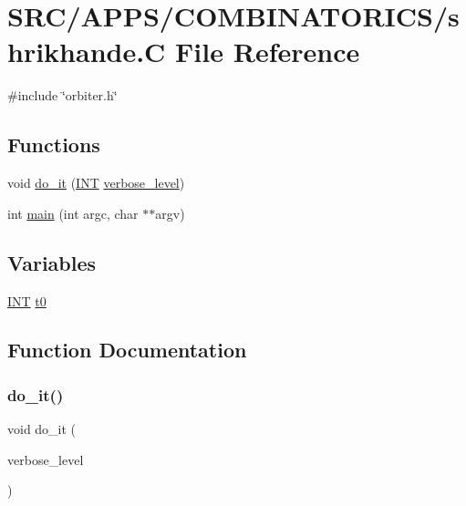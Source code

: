 \hypertarget{shrikhande_8_c}{}\section{S\+R\+C/\+A\+P\+P\+S/\+C\+O\+M\+B\+I\+N\+A\+T\+O\+R\+I\+C\+S/shrikhande.C File Reference}
\label{shrikhande_8_c}
{\ttfamily \#include \char`\"{}orbiter.\+h\char`\"{}}\newline
\subsection*{Functions}
\begin{DoxyCompactItemize}
\item 
void \mbox{\hyperlink{shrikhande_8_c_a23101cedc65bbf814b3b9ae081665765}{do\+\_\+it}} (\mbox{\hyperlink{galois_8h_a09fddde158a3a20bd2dcadb609de11dc}{I\+NT}} \mbox{\hyperlink{simeon_8_c_a818073fbcc2f439e7c56952f67386122}{verbose\+\_\+level}})
\item 
int \mbox{\hyperlink{shrikhande_8_c_a3c04138a5bfe5d72780bb7e82a18e627}{main}} (int argc, char $\ast$$\ast$argv)
\end{DoxyCompactItemize}
\subsection*{Variables}
\begin{DoxyCompactItemize}
\item 
\mbox{\hyperlink{galois_8h_a09fddde158a3a20bd2dcadb609de11dc}{I\+NT}} \mbox{\hyperlink{shrikhande_8_c_a4268f4fe222ffb119218a0199f5e1904}{t0}}
\end{DoxyCompactItemize}


\subsection{Function Documentation}
\mbox{\label{shrikhande_8_c_a23101cedc65bbf814b3b9ae081665765}} 
\subsubsection{\texorpdfstring{do\+\_\+it()}{do\_it()}}
{\footnotesize\ttfamily void do\+\_\+it (\begin{DoxyParamCaption}\item[{\mbox{\hyperlink{galois_8h_a09fddde158a3a20bd2dcadb609de11dc}{I\+NT}}}]{verbose\+\_\+level }\end{DoxyParamCaption})}

